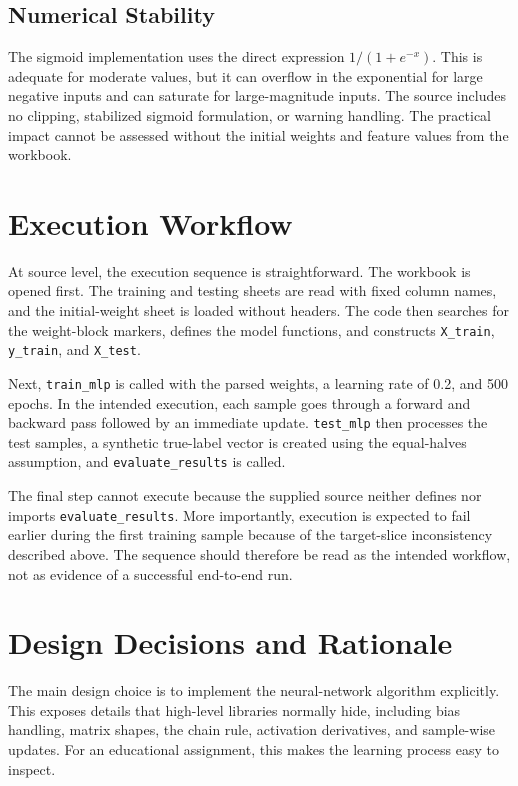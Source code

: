 \documentclass[11pt,a4paper]{article}
\newcommand{\code}[1]{\texttt{\small #1}}
\begin{document}
\subsection{Numerical Stability}
The sigmoid implementation uses the direct expression \(1/(1+e^{-x})\). This is adequate for moderate values, but it can overflow in the exponential for large negative inputs and can saturate for large-magnitude inputs. The source includes no clipping, stabilized sigmoid formulation, or warning handling. The practical impact cannot be assessed without the initial weights and feature values from the workbook.

\section{Execution Workflow}
At source level, the execution sequence is straightforward. The workbook is opened first. The training and testing sheets are read with fixed column names, and the initial-weight sheet is loaded without headers. The code then searches for the weight-block markers, defines the model functions, and constructs \code{X\_train}, \code{y\_train}, and \code{X\_test}.

Next, \code{train\_mlp} is called with the parsed weights, a learning rate of 0.2, and 500 epochs. In the intended execution, each sample goes through a forward and backward pass followed by an immediate update. \code{test\_mlp} then processes the test samples, a synthetic true-label vector is created using the equal-halves assumption, and \code{evaluate\_results} is called.

The final step cannot execute because the supplied source neither defines nor imports \code{evaluate\_results}. More importantly, execution is expected to fail earlier during the first training sample because of the target-slice inconsistency described above. The sequence should therefore be read as the intended workflow, not as evidence of a successful end-to-end run.

\section{Design Decisions and Rationale}
The main design choice is to implement the neural-network algorithm explicitly. This exposes details that high-level libraries normally hide, including bias handling, matrix shapes, the chain rule, activation derivatives, and sample-wise updates. For an educational assignment, this makes the learning process easy to inspect.
\end{document}
